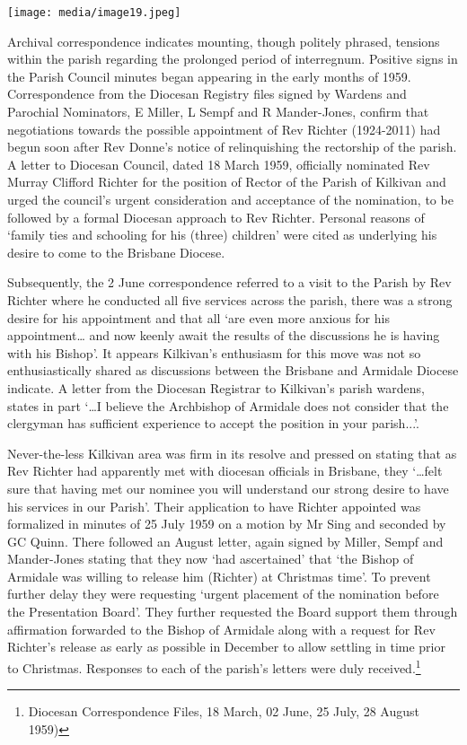 \texttt{[image: media/image19.jpeg]}

Archival correspondence indicates mounting, though politely phrased,
tensions within the parish regarding the prolonged period of
interregnum. Positive signs in the Parish Council minutes began
appearing in the early months of 1959. Correspondence from the Diocesan
Registry files signed by Wardens and Parochial Nominators, E Miller, L
Sempf and R Mander-Jones, confirm that negotiations towards the possible
appointment of Rev Richter (1924-2011) had begun soon after Rev Donne's
notice of relinquishing the rectorship of the parish. A letter to
Diocesan Council, dated 18 March 1959, officially nominated Rev Murray
Clifford Richter for the position of Rector of the Parish of Kilkivan
and urged the council's urgent consideration and acceptance of the
nomination, to be followed by a formal Diocesan approach to Rev Richter.
Personal reasons of `family ties and schooling for his (three) children'
were cited as underlying his desire to come to the Brisbane Diocese.

Subsequently, the 2 June correspondence referred to a visit to the
Parish by Rev Richter where he conducted all five services across the
parish, there was a strong desire for his appointment and that all `are
even more anxious for his appointment\ldots{} and now keenly await the
results of the discussions he is having with his Bishop'. It appears
Kilkivan's enthusiasm for this move was not so enthusiastically shared
as discussions between the Brisbane and Armidale Diocese indicate. A
letter from the Diocesan Registrar to Kilkivan's parish wardens, states
in part `\ldots I believe the Archbishop of Armidale does not consider
that the clergyman has sufficient experience to accept the position in
your parish...'.

Never-the-less Kilkivan area was firm in its resolve and pressed on
stating that as Rev Richter had apparently met with diocesan officials
in Brisbane, they `\ldots felt sure that having met our nominee you will
understand our strong desire to have his services in our Parish'. Their
application to have Richter appointed was formalized in minutes of 25
July 1959 on a motion by Mr Sing and seconded by GC Quinn. There
followed an August letter, again signed by Miller, Sempf and
Mander-Jones stating that they now `had ascertained' that `the Bishop of
Armidale was willing to release him (Richter) at Christmas time'. To
prevent further delay they were requesting `urgent placement of the
nomination before the Presentation Board'. They further requested the
Board support them through affirmation forwarded to the Bishop of
Armidale along with a request for Rev Richter's release as early as
possible in December to allow settling in time prior to Christmas.
Responses to each of the parish's letters were duly received.\footnote{Diocesan
  Correspondence Files, 18 March, 02 June, 25 July, 28 August 1959)}

